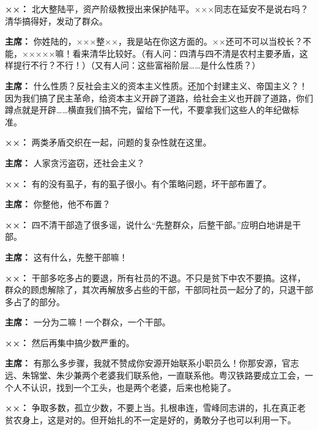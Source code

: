 \begin{list}{}
\item[\textbf{××：}] 北大整陆平，资产阶级教授出来保护陆平。×××同志在延安不是说右吗？清华搞得好，发动了群众。

\item[\textbf{主席：}] 你姓陆的，×××整××，我是站在你这方面的。××还可不可以当校长？不能，×××××嘛！看来清华比较好。（有人问：四清与四不清是农村主要矛盾，这样提行不行？不行！）（又有人问：这些富裕阶层……是什么性质？）

\item[\textbf{主席：}] 什么性质？反社会主义的资本主义性质。还加个封建主义、帝国主义？！因为我们搞了民主革命，给资本主义开辟了道路，给社会主义也开辟了道路，你们蹲点就是开辟……横直我们搞不完，留给下一代，不要拿我们这些人的年纪做标准。

\item[\textbf{××：}] 两类矛盾交织在一起，问题的复杂性就在这里。

\item[\textbf{主席：}] 人家贪污盗窃，还社会主义？

\item[\textbf{××：}] 有的没有虱子，有的虱子很小。有个策略问题，坏干部布置了。

\item[\textbf{主席：}] 你整他，他不布置？

\item[\textbf{××：}] 四不清干部造了很多谣，说什么“先整群众，后整干部。”应明白地讲是干部。

\item[\textbf{主席：}] 这有什么，先整干部嘛！

\item[\textbf{××：}] 干部多吃多占的要退，所有社员的不退。不只是贫下中农不要搞。这样，群众的顾虑解除了，其次再解放多占些的干部，干部同社员一起分了的，只退干部多占了的部分。

\item[\textbf{主席：}] 一分为二嘛！一个群众，一个干部。

\item[\textbf{××：}] 然后再集中搞少数严重的。

\item[\textbf{主席：}] 有那么多步骤，我就不赞成你安源开始联系小职员么！你那安源，官志远、朱锦堂、朱少兼两个老婆我们联系他，一直联系他。粤汉铁路要成立工会，一个人不认识，找到一个工头，也是两个老婆，后来也枪毙了。

\item[\textbf{××：}] 争取多数，孤立少数，不要上当。扎根串连，雪峰同志讲的，扎在真正老贫农身上，这是对的。但开始扎的不一定是好的，勇敢分子也可以利用一下。


\end{list}

